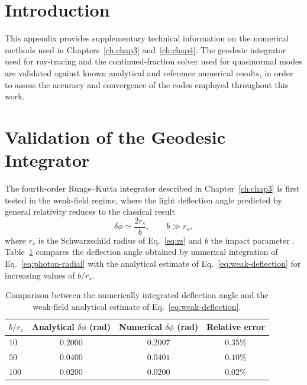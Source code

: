 
	\label{ann:A}
	
	\section*{Introduction}
	
	This appendix provides supplementary technical information on the numerical methods used in Chapters~\ref{ch:chap3} and~\ref{ch:chap4}. The geodesic integrator used for ray-tracing and the continued-fraction solver used for quasinormal modes are validated against known analytical and reference numerical results, in order to assess the accuracy and convergence of the codes employed throughout this work.
	
	\section*{Validation of the Geodesic Integrator}
	
	The fourth-order Runge--Kutta integrator described in Chapter~\ref{ch:chap3} is first tested in the weak-field regime, where the light deflection angle predicted by general relativity reduces to the classical result
	\begin{equation}
		\delta\phi \simeq \frac{2 r_s}{b}, \qquad b \gg r_s,
		\label{eq:weak-deflection}
	\end{equation}
	where $r_s$ is the Schwarzschild radius of Eq.~\eqref{eq:rs} and $b$ the impact parameter \cite{einstein1916}. Table~\ref{tab:deflection-validation} compares the deflection angle obtained by numerical integration of Eq.~\eqref{eq:photon-radial} with the analytical estimate of Eq.~\eqref{eq:weak-deflection} for increasing values of $b/r_s$.
	
	\begin{table}[H]
		\centering
		\caption{Comparison between the numerically integrated deflection angle and the weak-field analytical estimate of Eq.~\eqref{eq:weak-deflection}.}
		\label{tab:deflection-validation}
		\begin{tabular}{lccc}
			\hline
			\textbf{$b/r_s$} & \textbf{Analytical $\delta\phi$ (rad)} & \textbf{Numerical $\delta\phi$ (rad)} & \textbf{Relative error} \\
			\hline
			$10$ & $0.2000$ & $0.2007$ & $0.35\%$ \\
			$50$ & $0.0400$ & $0.0401$ & $0.10\%$ \\
			$100$ & $0.0200$ & $0.0200$ & $0.02\%$ \\
			\hline
		\end{tabular}
	\end{table}
	
